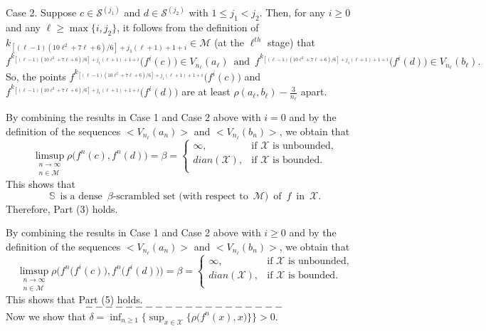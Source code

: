 \documentclass[12pt]{article}
\begin{document}
Case 2. Suppose $c \in \mathcal S^{(j_1)}$ and $d \in \mathcal S^{(j_2)}$ with $1 \le j_1 < j_2$.  Then, for any $i \ge 0$ and any $\ell \ge \max \{ i, j_2 \}$, it follows from the definition of $k_{[(\ell-1)(10\ell^2+7\ell+6)/6]+j_1(\ell+1)+1+i} \in \mathcal M$ (at the $\ell^{th}$ stage) that 
$$
f^{k_{[(\ell-1)(10\ell^2+7\ell+6)/6]+j_1(\ell+1)+1+i}}\big(f^i(c)\big) \in V_{n_\ell}(a_\ell) \,\,\, \text{and} \,\,\, f^{k_{[(\ell-1)(10\ell^2+7\ell+6)/6]+j_1(\ell+1)+1+i}}\big(f^i(d)\big) \in V_{n_\ell}(b_\ell).
$$
So, the points $f^{k_{[(\ell-1)(10\ell^2+7\ell+6)/6]+j_1(\ell+1)+1+i}}\big(f^i(c)\big)$ and $f^{k_{[(\ell-1)(10\ell^2+7\ell+6)/6]+j_1(\ell+1)+1+i}}\big(f^i(d)\big)$ are at least $\rho(a_\ell, b_\ell) - \frac 3{n_\ell}$ apart.  

By combining the results in Case 1 and Case 2 above with $i = 0$ and by the definition of the sequences $<V_{n_\ell}(a_n)>$ and $<V_{n_\ell}(b_n)>$, we obtain that 
$$
\limsup_{\substack{n \to \infty \\ n \in \mathcal M}} \rho\big(f^n(c), f^n(d)\big) = \beta = \begin{cases}
                       \infty, & \text{if $\mathcal X$ is unbounded,} \\
                       dian(\mathcal X), & \text{if $\mathcal X$ is bounded.} \\
                       \end{cases}
$$
This shows that 
$$
\mathbb S \,\,\, \text{is a dense} \,\,\, \beta\text{-scrambled set (with respect to} \,\,\, \mathcal M) \,\,\, \text{of} \,\,\, f \,\,\, \text{in} \,\,\, \mathcal X.
$$
Therefore, Part (3) holds.

By combining the results in Case 1 and Case 2 above with $i \ge 0$ and by the definition of the sequences $<V_{n_\ell}(a_n)>$ and $<V_{n_\ell}(b_n)>$, we obtain that 
$$
\limsup_{\substack{n \to \infty \\ n \in \mathcal M}} \rho\big(f^n\big(f^i(c)\big), f^n\big(f^i(d)\big)\big) = \beta = \begin{cases}
                       \infty, & \text{if $\mathcal X$ is unbounded,} \\
                       dian(\mathcal X), & \text{if $\mathcal X$ is bounded.} \\
                       \end{cases}
$$
This shows that Part (5) holds.
$$--------------------$$
\indent Now we show that $\delta = \inf_{n \ge 1} \bigg\{ \sup_{x \in \mathcal X} \big\{ \rho\big(f^n(x), x\big) \big\} \bigg\} > 0$.  
\end{document}
